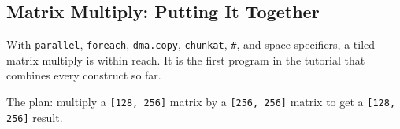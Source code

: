 \subsection*{Matrix Multiply: Putting It Together}

With \texttt{parallel}, \texttt{foreach}, \texttt{dma.copy}, \texttt{chunkat}, \texttt{\#}, and space specifiers, a tiled matrix multiply is within reach. It is the first program in the tutorial that combines every construct so far.

The plan: multiply a \texttt{[128, 256]} matrix by a \texttt{[256, 256]} matrix to get a \texttt{[128, 256]} result.
